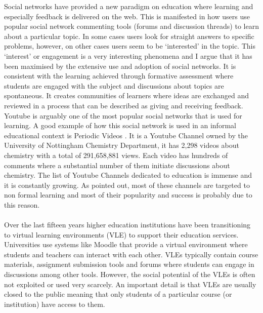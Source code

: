 \documentclass[11pt, oneside]{article}   	%
\begin{document}
Social networks have provided a new paradigm on education where learning and especially feedback is delivered on the web. This is manifested in how users use popular social network commenting tools (forums and discussion threads) to learn about a particular topic. In some cases users look for straight answers to specific problems, however, on other cases users seem to be `interested' in the topic. This `interest' or engagement is a very interesting phenomena and I argue that it has been maximised by the extensive use and adoption of social networks. It is consistent with the learning achieved through formative assessment where students are engaged with the subject and discussions about topics are spontaneous. It creates communities of learners where ideas are exchanged and reviewed in a process that can be described as giving and receiving feedback.\\ Youtube is arguably one of the most popular social networks that is used for learning. A good example of how this social network is used in an informal educational context is Periodic Videos \cite{PeriodicVideos}. It is a Youtube Channel owned by the University of Nottingham Chemistry Department, it has 2,298 videos about chemistry with a total of 291,658,881 views. Each video has hundreds of comments where a substantial number of them initiate discussions about chemistry. The list of Youtube Channels dedicated to education is immense and it is constantly growing. As pointed out, most of these channels are targeted to non formal learning and most of their popularity and success is probably due to this reason.\\\\
Over the last fifteen years higher education institutions have been transitioning to virtual learning environments (VLE) to support their education services. Universities use systems like Moodle \cite{Moodle} that provide a virtual environment where students and teachers can interact with each other. VLEs typically contain course materials, assignment submission tools and forums where students can engage in discussions among other tools. However, the social potential of the VLEs is often not exploited or used very scarcely. An important detail is that VLEs are usually closed to the public meaning that only students of a particular course (or institution) have access to them.\\\\
\end{document}

